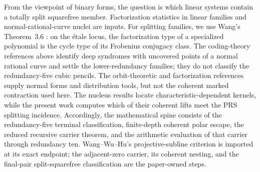 From the viewpoint of binary forms, the question is which linear
systems contain a totally split squarefree member.  Factorization
statistics in linear families \cite{CMP2017} and
normal-rational-curve nuclei
\cite[Lem.~1 and Thm.~1]{GmainerHavlicek2013} are inputs.
For splitting families, we use Wang's Theorem~3.6
\cite{Wang2026}: on the \'etale locus, the factorization type of a
specialized polynomial is the cycle type of its Frobenius conjugacy
class.  The coding-theory references above
identify deep syndromes with uncovered points of a
normal rational curve and settle the lower-redundancy families; they do
not classify the redundancy-five cubic pencils.  The orbit-theoretic
and factorization references supply normal forms and distribution
tools, but not the coherent marked contraction used here.  The nucleus
results locate characteristic-dependent kernels, while the present
work computes which of their coherent lifts meet the PRS splitting
incidence.  Accordingly, the mathematical spine consists of the
redundancy-five terminal classification, finite-depth coherent polar escape,
the reduced recursive carrier theorem, and the arithmetic evaluation of
that carrier through redundancy ten.  Wang--Wu--Hu's projective-subline
criterion is imported at its exact endpoint; the adjacent-zero carrier, its
coherent nesting, and the final-pair split-squarefree classification are the
paper-owned steps.
